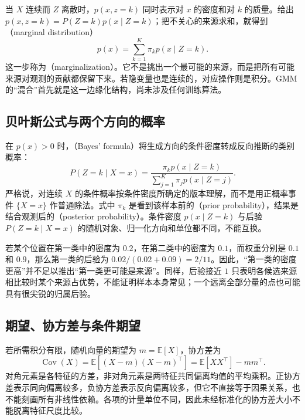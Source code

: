 \documentclass[UTF8]{ctexart}
\begin{document}
当 $X$ 连续而 $Z$ 离散时，$p(x,z=k)$ 同时表示对 $x$ 的密度和对 $k$ 的质量。给出 $p(x,z=k)=P(Z=k)p(x\mid Z=k)$；把不关心的来源求和，就得到（marginal distribution）
\begin{equation}
p(x)=\sum_{k=1}^K\pi_kp(x\mid Z=k).
\label{eq:gmm-total-probability}
\end{equation}
这一步称为（marginalization）。它不是挑出一个最可能的来源，而是把所有可能来源对观测的贡献都保留下来。若隐变量也是连续的，对应操作则是积分。GMM 的“混合”首先就是这一边缘化结构，尚未涉及任何训练算法。

\subsection{贝叶斯公式与两个方向的概率}
在 $p(x)>0$ 时，（Bayes' formula）将生成方向的条件密度转成反向推断的类别概率：
\begin{equation}
P(Z=k\mid X=x)=\frac{\pi_kp(x\mid Z=k)}{\sum_{j=1}^K\pi_jp(x\mid Z=j)}.
\label{eq:gmm-bayes}
\end{equation}
严格说，对连续 $X$ 的条件概率按条件密度所确定的版本理解，而不是用正概率事件 $\{X=x\}$ 作普通除法。式中 $\pi_k$ 是看到该样本前的（prior probability），结果是结合观测后的（posterior probability）。条件密度 $p(x\mid Z=k)$ 与后验 $P(Z=k\mid X=x)$ 的随机对象、归一化方向和单位都不同，不能互换。

若某个位置在第一类中的密度为 $0.2$，在第二类中的密度为 $0.1$，而权重分别是 $0.1$ 和 $0.9$，那么第一类的后验为 $0.02/(0.02+0.09)=2/11$。因此，“第一类的密度更高”并不足以推出“第一类更可能是来源”。同样，后验接近 $1$ 只表明各候选来源相比较时某个来源占优势，不能证明样本本身常见；一个远离全部分量的点也可能具有很尖锐的归属后验。

\subsection{期望、协方差与条件期望}
若所需积分有限，随机向量的期望为 $m=\mathbb E[X]$，协方差为
\begin{equation}
\operatorname{Cov}(X)=\mathbb E[(X-m)(X-m)^\top]
=\mathbb E[XX^\top]-mm^\top.
\label{eq:gmm-covariance}
\end{equation}
对角元素是各特征的方差，非对角元素是两特征共同偏离均值的平均乘积。正协方差表示同向偏离较多，负协方差表示反向偏离较多，但它不直接等于因果关系，也不能刻画所有非线性依赖。各项的计量单位不同，因此未经标准化的协方差大小不能脱离特征尺度比较。
\end{document}
